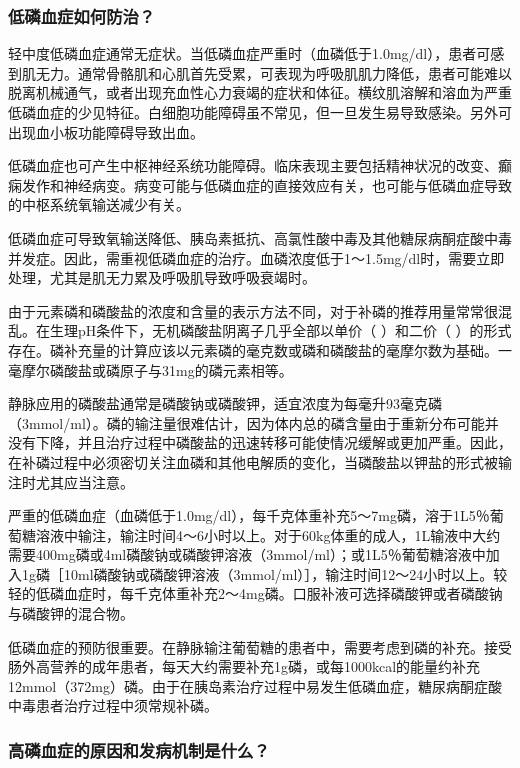\subsubsection{低磷血症如何防治？}

轻中度低磷血症通常无症状。当低磷血症严重时（血磷低于1.0mg/dl），患者可感到肌无力。通常骨骼肌和心肌首先受累，可表现为呼吸肌肌力降低，患者可能难以脱离机械通气，或者出现充血性心力衰竭的症状和体征。横纹肌溶解和溶血为严重低磷血症的少见特征。白细胞功能障碍虽不常见，但一旦发生易导致感染。另外可出现血小板功能障碍导致出血。

低磷血症也可产生中枢神经系统功能障碍。临床表现主要包括精神状况的改变、癫痫发作和神经病变。病变可能与低磷血症的直接效应有关，也可能与低磷血症导致的中枢系统氧输送减少有关。

低磷血症可导致氧输送降低、胰岛素抵抗、高氯性酸中毒及其他糖尿病酮症酸中毒并发症。因此，需重视低磷血症的治疗。血磷浓度低于1～1.5mg/dl时，需要立即处理，尤其是肌无力累及呼吸肌导致呼吸衰竭时。

由于元素磷和磷酸盐的浓度和含量的表示方法不同，对于补磷的推荐用量常常很混乱。在生理pH条件下，无机磷酸盐阴离子几乎全部以单价（
）和二价（
）的形式存在。磷补充量的计算应该以元素磷的毫克数或磷和磷酸盐的毫摩尔数为基础。一毫摩尔磷酸盐或磷原子与31mg的磷元素相等。

静脉应用的磷酸盐通常是磷酸钠或磷酸钾，适宜浓度为每毫升93毫克磷（3mmol/ml）。磷的输注量很难估计，因为体内总的磷含量由于重新分布可能并没有下降，并且治疗过程中磷酸盐的迅速转移可能使情况缓解或更加严重。因此，在补磷过程中必须密切关注血磷和其他电解质的变化，当磷酸盐以钾盐的形式被输注时尤其应当注意。

严重的低磷血症（血磷低于1.0mg/dl），每千克体重补充5～7mg磷，溶于1L5％葡萄糖溶液中输注，输注时间4～6小时以上。对于60kg体重的成人，1L输液中大约需要400mg磷或4ml磷酸钠或磷酸钾溶液（3mmol/ml）；或1L5％葡萄糖溶液中加入1g磷［10ml磷酸钠或磷酸钾溶液（3mmol/ml）］，输注时间12～24小时以上。较轻的低磷血症时，每千克体重补充2～4mg磷。口服补液可选择磷酸钾或者磷酸钠与磷酸钾的混合物。

低磷血症的预防很重要。在静脉输注葡萄糖的患者中，需要考虑到磷的补充。接受肠外高营养的成年患者，每天大约需要补充1g磷，或每1000kcal的能量约补充12mmol（372mg）磷。由于在胰岛素治疗过程中易发生低磷血症，糖尿病酮症酸中毒患者治疗过程中须常规补磷。

\subsubsection{高磷血症的原因和发病机制是什么？}

